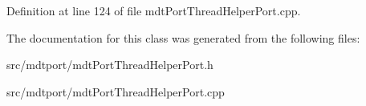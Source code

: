 Definition at line 124 of file mdtPortThreadHelperPort.cpp.



The documentation for this class was generated from the following files:\begin{DoxyCompactItemize}
\item 
src/mdtport/mdtPortThreadHelperPort.h\item 
src/mdtport/mdtPortThreadHelperPort.cpp\end{DoxyCompactItemize}
